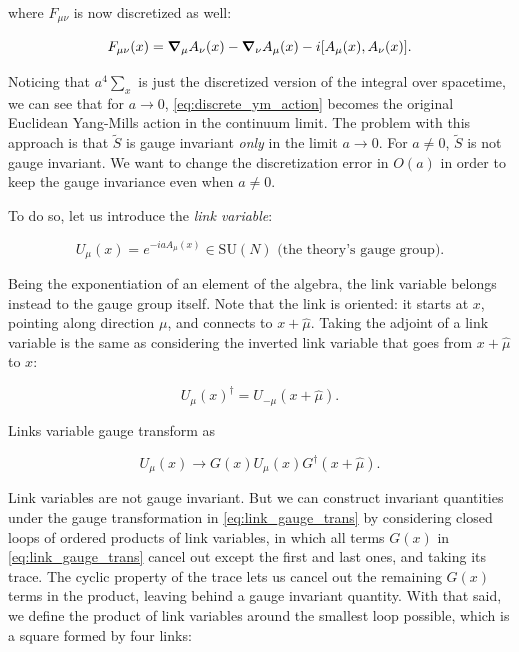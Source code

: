 \documentclass[reqno,12pt]{article}
\numberwithin{equation}{section}
\newcommand{\SU}{\mathrm{SU}}
\begin{document}
where $F_{\mu\nu}$ is now discretized as well:

\begin{equation} \label{eq:discrete_Fmunu}
	F_{\mu\nu}(x) = \grad_\mu A_\nu(x) - \grad_\nu A_\mu(x) - i\qty[A_\mu(x), A_\nu(x)].
\end{equation}

Noticing that $a^4 \sum_x$ is just the discretized version of the integral over spacetime, we can see that for
$a \rightarrow 0$, \eqref{eq:discrete_ym_action} becomes the original Euclidean Yang-Mills action in the continuum limit.
The problem with this approach is that $\widetilde{S}$ is gauge invariant \textit{only} in the limit $a \rightarrow 0$. For
$a \ne 0$, $\widetilde{S}$ is not gauge invariant. We want to change the discretization error in $O(a)$ in order to keep the 
gauge invariance even when $a \ne 0$.

To do so, let us introduce the \textit{link variable}:

\begin{equation} \label{eq:link}
	U_\mu(x) = e^{-iaA_\mu(x)} \in \SU(N) \text{ (the theory's gauge group)}.
\end{equation}

Being the exponentiation of an element of the algebra, the link variable belongs instead to the gauge group itself.
Note that the link is oriented: it starts at $x$, pointing along direction $\mu$, and connects to $x + \hat{\mu}$. Taking
the adjoint of a link variable is the same as considering the inverted link variable that goes from $x + \hat{\mu}$ to $x$:

\begin{equation}
	U_\mu(x)^\dagger = U_{-\mu}(x + \hat{\mu}).
\end{equation}

Links variable gauge transform as

\begin{equation} \label{eq:link_gauge_trans}
	U_\mu(x) \rightarrow G(x) U_\mu(x) G^\dagger(x + \hat{\mu}).
\end{equation}

Link variables are not gauge invariant. But we can construct invariant quantities under the gauge transformation in \eqref{eq:link_gauge_trans}
by considering closed loops of
ordered products of link variables, in which all terms $G(x)$ in \eqref{eq:link_gauge_trans} cancel out except the first and
last ones, and taking its trace. The cyclic property of the trace lets us cancel out the remaining $G(x)$ terms in the product,
leaving behind a gauge invariant quantity. With that said, we define the product of link variables around the smallest
loop possible, which is a square formed by four links:
\end{document}
